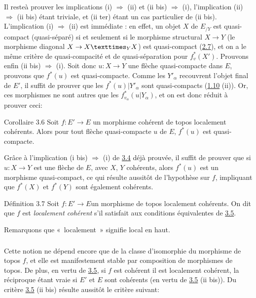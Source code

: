 \documentclass[10pt]{../fichiers-configuration-latex/smfart}
\begin{document}
Il reste\pageoriginale à prouver les implications (i) $\Rightarrow$
(ii) et  (ii bis) $\Rightarrow$ (i), l'implication  (ii) $\Rightarrow$ (ii bis)
étant triviale, et (ii ter) étant un cas particulier de (ii
bis). L'implication  (i) $\Rightarrow$ (ii) est immédiate : en effet,
un objet $X$ de $E_{/Y}$ est quasi-compact (\resp quasi-séparé) si et
seulement si le morphisme structural $X \to Y$ (\resp le morphisme
diagonal $X \to \fprod{X}{X}{Y}$) est quasi-compact (\hyperref[VI.cor2.7]{2.7}), et on a le
même critère de quasi-compacité et de quasi-séparation pour
$f^{\ast}_v (X')$. Prouvons enfin  (ii bis) $\Rightarrow$ (i). Soit
donc $u : X \to Y$ une flèche quasi-compacte dans $E$, prouvons que
$f^{\ast}(u)$ est quasi-compacte. Comme les $Y'_{\alpha}$
recouvrent l'objet final de $E'$, il suffit de prouver que les
$f^{\ast}(u) | Y'_{\alpha}$ sont quasi-compacts (\hyperref[VI.prop1.10]{1.10} (ii)). Or,
ces morphismes ne sont autres que les $f^{\ast}_{v_\alpha}(u |
Y_{\alpha})$, et on est donc réduit à prouver ceci:

\begin{enonce*}{Corollaire 3.6}
Soit $f : E'\to E$ un morphisme cohérent de topos localement
cohérents. Alors pour tout flèche quasi-compacte $u$ de $E$,
$f^{\ast}(u)$ est quasi-compacte.
\end{enonce*}

Grâce à l'implication (i bis) $\Rightarrow$ (i) de \hyperref[VI.prop3.4]{3.4} déjà prouvée,
il suffit de prouver que si $u : X \to Y$ est une flèche de $E$, avec
$X$, $Y$ cohérents, alors $f^{\ast}(u)$ est un morphisme
quasi-compact, ce qui résulte
aussitôt de l'hypothèse sur $f$, impliquant que $f^{\ast}(X)$
et $f^{\ast}(Y)$ sont également cohérents.

\begin{enonce*}{Définition 3.7}
Soit $f : E'\to E$\pageoriginale un morphisme de topos localement
cohérents. On dit que $f$ est \emph{localement cohérent} s'il satisfait aux conditions
équivalentes de \hyperref[VI.prop3.5]{3.5}.
\end{enonce*}

Remarquons que « localement » signifie local en haut.

\setcounter{subsection}{7}
\setcounter{subsubsection}{0}
\subsubsection{}
Cette notion ne dépend encore que de la classe d'isomorphie du
morphisme de topos $f$, et elle est manifestement stable par
composition de morphismes de topos. De plus, en vertu de \hyperref[VI.prop3.5]{3.5}, si $f$
est cohérent il est localement cohérent, la réciproque étant vraie si
$E'$ et $E$ sont cohérents (en vertu de \hyperref[VI.prop3.5]{3.5} (ii bis)). Du critère \hyperref[VI.prop3.5]{3.5}
(ii bis) résulte aussitôt le critère suivant:
\end{document}
